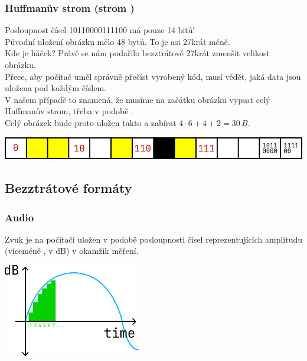 \documentclass[aspectratio=169,11pt,svgnames,handout]{beamer}
\begin{document}
\begin{frame}
 \frametitle{Huffmanův strom (strom )}
 Posloupnost čísel 10110000111100 má pouze \alert{14 bitů}!\pause\\
 Původní uložení obrázku mělo 48 bytů. To je asi 27krát méně.\pause\\
 Kde je háček? Právě se nám podařilo bezztrátově 27krát zmenšit velikost
 obrázku.\pause\\
 Přece, aby počítač uměl správně přečíst vyrobený kód, musí vědět, jaká data
 jsou uložena pod každým číslem.\pause\\
 V našem případě to znamená, že musíme na začátku obrázku vypsat \alert{celý
 Huffmanův strom}, třeba v podobě .\pause\\
 Celý obrázek bude proto uložen takto a zabírat $4 \cdot 6 + 4 + 2 = 30\,B$.
 \begin{center}
  \includegraphics[width=\textwidth]{tree-7.pdf}
  \vspace*{-.5em}
 \end{center}
\end{frame}

\subsection{Bezztrátové formáty}

\begin{frame}
 \subsectionpage
\end{frame}

\begin{frame}
 \frametitle{Audio}
 Zvuk je na počítači uložen v podobě posloupnosti čísel reprezentujících
 \alert{amplitudu} (víceméně , v dB) \alert{v okamžik měření}.
 \pause
 \begin{center}
  \includegraphics[width=6cm]{amplitude.pdf}
 \end{center}
\end{frame}
\end{document}
